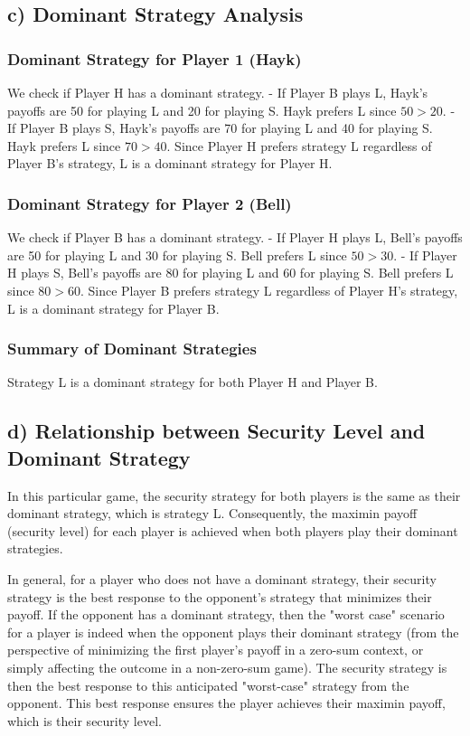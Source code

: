 \documentclass{article}
\begin{document}
\subsection*{c) Dominant Strategy Analysis}

\subsubsection*{Dominant Strategy for Player 1 (Hayk)}
We check if Player H has a dominant strategy.
- If Player B plays L, Hayk's payoffs are 50 for playing L and 20 for playing S. Hayk prefers L since $50 > 20$.
- If Player B plays S, Hayk's payoffs are 70 for playing L and 40 for playing S. Hayk prefers L since $70 > 40$.
Since Player H prefers strategy L regardless of Player B's strategy, L is a dominant strategy for Player H.

\subsubsection*{Dominant Strategy for Player 2 (Bell)}
We check if Player B has a dominant strategy.
- If Player H plays L, Bell's payoffs are 50 for playing L and 30 for playing S. Bell prefers L since $50 > 30$.
- If Player H plays S, Bell's payoffs are 80 for playing L and 60 for playing S. Bell prefers L since $80 > 60$.
Since Player B prefers strategy L regardless of Player H's strategy, L is a dominant strategy for Player B.

\subsubsection*{Summary of Dominant Strategies}
Strategy L is a dominant strategy for both Player H and Player B.

\subsection*{d) Relationship between Security Level and Dominant Strategy}
In this particular game, the security strategy for both players is the same as their dominant strategy, which is strategy L. Consequently, the maximin payoff (security level) for each player is achieved when both players play their dominant strategies.

In general, for a player who does not have a dominant strategy, their security strategy is the best response to the opponent's strategy that minimizes their payoff. If the opponent has a dominant strategy, then the "worst case" scenario for a player is indeed when the opponent plays their dominant strategy (from the perspective of minimizing the first player's payoff in a zero-sum context, or simply affecting the outcome in a non-zero-sum game). The security strategy is then the best response to this anticipated "worst-case" strategy from the opponent. This best response ensures the player achieves their maximin payoff, which is their security level.
\end{document}
